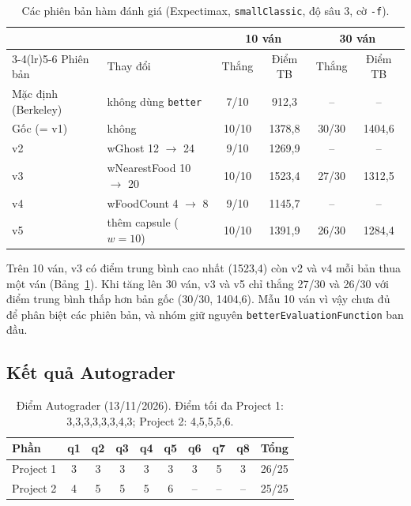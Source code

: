 \documentclass[conference]{IEEEtran}
\begin{document}
\begin{table}[!ht]
    \centering
    \scriptsize
    \setlength{\tabcolsep}{3pt}
    \caption{Các phiên bản hàm đánh giá (Expectimax, \texttt{smallClassic}, độ sâu 3, cờ \texttt{-f}).}
    \label{tab:ver}
    \begin{tabular}{llcccc}
    \toprule
    & & \multicolumn{2}{c}{10 ván} & \multicolumn{2}{c}{30 ván} \\
    \cmidrule(lr){3-4}\cmidrule(lr){5-6}
    Phiên bản & Thay đổi & Thắng & Điểm TB & Thắng & Điểm TB \\
    \midrule
    Mặc định (Berkeley) & không dùng \texttt{better} & 7/10 & 912,3 & -- & -- \\
    Gốc (= v1) & không & 10/10 & 1378,8 & 30/30 & 1404,6 \\
    v2 & wGhost 12 $\to$ 24 & 9/10 & 1269,9 & -- & -- \\
    v3 & wNearestFood 10 $\to$ 20 & 10/10 & 1523,4 & 27/30 & 1312,5 \\
    v4 & wFoodCount 4 $\to$ 8 & 9/10 & 1145,7 & -- & -- \\
    v5 & thêm capsule ($w=10$) & 10/10 & 1391,9 & 26/30 & 1284,4 \\
    \bottomrule
    \end{tabular}
\end{table}

Trên 10 ván, v3 có điểm trung bình cao nhất (1523,4) còn v2 và v4 mỗi bản thua một ván (Bảng~\ref{tab:ver}). Khi tăng lên 30 ván, v3 và v5 chỉ thắng 27/30 và 26/30 với điểm trung bình thấp hơn bản gốc (30/30, 1404,6). Mẫu 10 ván vì vậy chưa đủ để phân biệt các phiên bản, và nhóm giữ nguyên \texttt{betterEvaluationFunction} ban đầu.

\subsection{Kết quả Autograder}
\begin{table}[!ht]
    \centering
    \scriptsize
    \setlength{\tabcolsep}{3pt}
    \caption{Điểm Autograder (13/11/2026). Điểm tối đa Project 1: 3,3,3,3,3,3,4,3; Project 2: 4,5,5,5,6.}
    \label{tab:grader}
    \begin{tabular}{lccccccccc}
    \toprule
    Phần & q1 & q2 & q3 & q4 & q5 & q6 & q7 & q8 & Tổng \\
    \midrule
    Project 1 & 3 & 3 & 3 & 3 & 3 & 3 & 5 & 3 & 26/25 \\
    Project 2 & 4 & 5 & 5 & 5 & 6 & -- & -- & -- & 25/25 \\
    \bottomrule
    \end{tabular}
\end{table}
\end{document}
